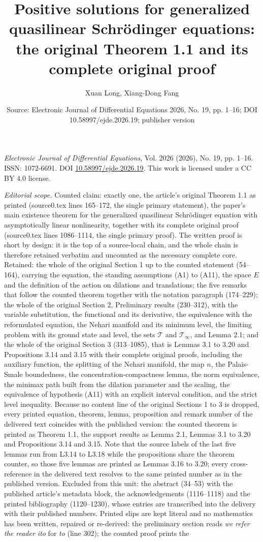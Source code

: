\documentclass[10pt,a4paper]{amsart}
\title[Positive solutions for generalized quasilinear Schr\"odinger equations: original Theorem 1.1]{Positive solutions for generalized quasilinear Schr\"odinger equations: the original Theorem 1.1 and its complete original proof}
\author{Xuan Long, Xiang-Dong Fang}
\date{Source: Electronic Journal of Differential Equations 2026, No. 19, pp. 1--16; DOI 10.58997/ejde.2026.19; publisher version}
\numberwithin{equation}{section}
\begin{document}
\maketitle
\noindent\emph{Electronic Journal of Differential Equations}, Vol. 2026 (2026), No. 19, pp. 1--16.\newline
ISSN: 1072-6691. DOI \href{https://doi.org/10.58997/ejde.2026.19}{10.58997/ejde.2026.19}. This work is licensed under a CC BY 4.0 license.\par\smallskip
\noindent\textit{Editorial scope.} Counted claim: exactly one, the article's original Theorem 1.1 as printed (source0.tex lines 165--172, the single primary statement), the paper's main existence theorem for the generalized quasilinear Schr\"odinger equation with asymptotically linear nonlinearity, together with its complete original proof (source0.tex lines 1086--1114, the single primary proof). The written proof is short by design: it is the top of a source-local chain, and the whole chain is therefore retained verbatim and uncounted as the necessary complete core. Retained: the whole of the original Section 1 up to the counted statement (54--164), carrying the equation, the standing assumptions (A1) to (A11), the space $E$ and the definition of the action on dilations and translations; the five remarks that follow the counted theorem together with the notation paragraph (174--229); the whole of the original Section 2, Preliminary results (230--312), with the variable substitution, the functional and its derivative, the equivalence with the reformulated equation, the Nehari manifold and its minimum level, the limiting problem with its ground state and level, the sets $\mathcal{T}$ and $\mathcal{T}_\infty$, and Lemma 2.1; and the whole of the original Section 3 (313--1085), that is Lemmas 3.1 to 3.20 and Propositions 3.14 and 3.15 with their complete original proofs, including the auxiliary function, the splitting of the Nehari manifold, the map $n$, the Palais-Smale boundedness, the concentration-compactness lemma, the norm equivalence, the minimax path built from the dilation parameter and the scaling, the equivalence of hypothesis (A11) with an explicit interval condition, and the strict level inequality. Because no content line of the original Sections 1 to 3 is dropped, every printed equation, theorem, lemma, proposition and remark number of the delivered text coincides with the published version: the counted theorem is printed as Theorem 1.1, the support results as Lemma 2.1, Lemmas 3.1 to 3.20 and Propositions 3.14 and 3.15. Note that the source labels of the last five lemmas run from L3.14 to L3.18 while the propositions share the theorem counter, so those five lemmas are printed as Lemmas 3.16 to 3.20; every cross-reference in the delivered text resolves to the same printed number as in the published version. Excluded from this unit: the abstract (34--53) with the published article's metadata block, the acknowledgements (1116--1118) and the printed bibliography (1120--1230), whose entries are transcribed into the delivery with their published numbers. Printed slips are kept literal and no mathematics has been written, repaired or re-derived: the preliminary section reads \emph{we refer the reader ito} for \emph{to} (line 302); the counted proof prints the 
\end{document}
